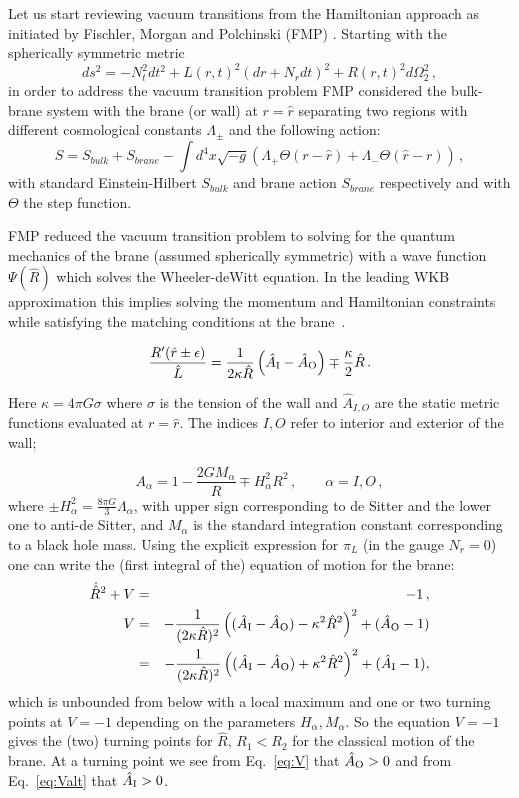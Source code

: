\documentclass[a4paper,11pt]{article}
\numberwithin{equation}{section}
\newcommand{\be}{\begin{equation}}
\newcommand{\ee}{\end{equation}}
\numberwithin{equation}{section}
\begin{document}
Let us start reviewing vacuum transitions from the Hamiltonian approach as initiated by Fischler, Morgan and Polchinski (FMP) \cite{Fischler:1990pk}.  Starting with the spherically symmetric metric
 \be
 ds^2=-N_t^2 dt^2+L(r,t)^2 (dr+N_r dt)^2+R(r,t)^2 d\Omega_2^2 \,,
 \ee
in order to address the vacuum transition problem FMP considered the bulk-brane system with the brane (or wall) at $r=\hat r$ separating two regions with different cosmological constants $\Lambda_\pm$
and the following action:
\be
S=S_{bulk}+S_{brane}-\int d^4x \sqrt{-g}\left(\Lambda_+\Theta(r-\hat{r})+\Lambda_-\Theta(\hat{r}-r)\right) \,,
\ee
with standard Einstein-Hilbert   $S_{bulk}$ and brane action $S_{brane} $ respectively  and
 with $\Theta$ the step function. 

FMP reduced the vacuum transition problem to solving for the quantum mechanics of the
brane (assumed spherically symmetric) with a wave function $\Psi(\hat{R})$
which solves the Wheeler-deWitt  equation. In the leading WKB approximation this
implies solving the momentum and Hamiltonian constraints while satisfying
the matching conditions at the brane~\cite{Blau:1986cw}.

\be
\label{eq:JunctionConditions}
\frac{R'(\hat{r}\pm\epsilon)}{\hat{L}}=\frac{1}{2\kappa\hat{R}}\left(\hat{A}_{{\rm I}}-\hat{A}_{{\rm O}}\right)\mp\frac{\kappa}{2}\hat{R} \,.
\ee
 
Here $\kappa=4\pi G\sigma$  where $\sigma$ is the tension of the wall and $\hat{A}_{I,O}$ are the static metric functions evaluated at $r=\hat r$. The indices $I,O$ refer to interior and exterior of the wall;
 
 \be
 A_{\alpha}  = 1-\frac{2GM_{\alpha}}{R}\mp H_{\alpha}^{2}R^{2}\,,  \qquad \alpha=I,O \,,
\ee
 where $ \pm H_{\alpha}^{2}=\frac{8\pi G}{3}\Lambda_{\alpha} $, with upper sign corresponding to de Sitter and the lower one to anti-de Sitter, and $M_\alpha$ is the standard integration constant corresponding to a black hole mass.
 Using the explicit expression for $\pi_{L}$ (in the gauge $N_{r}=0$)
one can write the (first integral of the) equation of motion for the
brane:
\begin{eqnarray}
\dot{\hat{R}}^{2}+V & = & -1 \,,\label{eq:EofM}\\
V & = & -\frac{1}{(2\kappa\hat{R})^{2}}\left((\hat{A}_{{\rm I}}-\hat{A}_{{\rm O}})-\kappa^{2}\hat{R}^{2}\right)^{2}+(\hat{A}_{{\rm O}}-1)\label{eq:V}\\
 & = & -\frac{1}{(2\kappa\hat{R})^{2}}\left((\hat{A}_{{\rm I}}-\hat{A}_{{\rm O}})+\kappa^{2}\hat{R}^{2}\right)^{2}+(\hat{A}_{{\rm I}}-1),\label{eq:Valt}
\end{eqnarray}
which is unbounded from below with a local maximum and one or two turning points at $V=-1$ depending on the parameters $H_\alpha, M_\alpha$. 
So the equation $V=-1$ gives the (two) turning points for $\hat{R}$,
$R_{1}<R_{2}$ for the classical motion of the brane. At a turning
point we see from Eq.~\eqref{eq:V} that $\hat{A}_{{\rm O}}>0$ and from Eq.~\eqref{eq:Valt} that $\hat{A}_{{\rm I}}>0$. 
\end{document}
